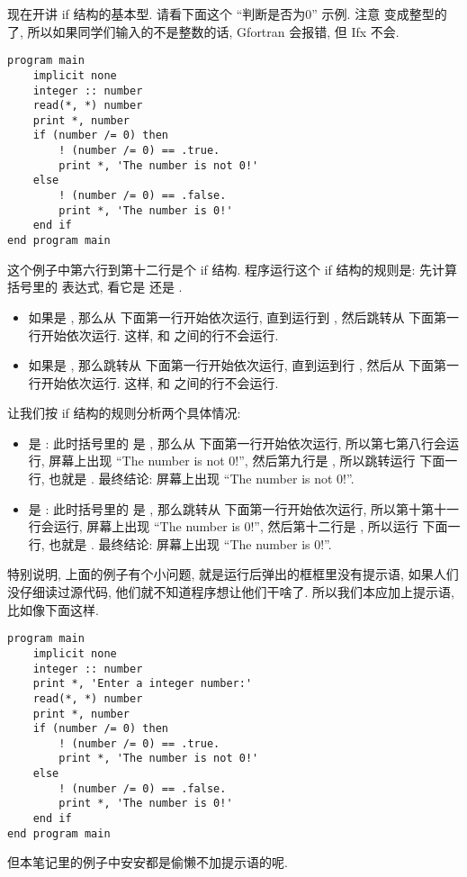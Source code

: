 现在开讲 if 结构的基本型. 请看下面这个 ``判断是否为0'' 示例. 注意  变成整型的了, 所以如果同学们输入的不是整数的话, Gfortran 会报错, 但 Ifx 不会.\label{whether_zero}
\begin{lstlisting}
program main
    implicit none
    integer :: number
    read(*, *) number
    print *, number
    if (number /= 0) then
        ! (number /= 0) == .true.
        print *, 'The number is not 0!'
    else
        ! (number /= 0) == .false.
        print *, 'The number is 0!'
    end if
end program main
\end{lstlisting}
这个例子中第六行到第十二行是个 if 结构. 程序运行这个 if 结构的规则是: 先计算括号里的 表达式, 看它是  还是 .
\begin{itemize}
    \item 如果是 , 那么从  下面第一行开始依次运行, 直到运行到  , 然后跳转从  下面第一行开始依次运行. 这样,  和  之间的行不会运行.
    \item 如果是 , 那么跳转从  下面第一行开始依次运行, 直到运到行  , 然后从  下面第一行开始依次运行. 这样,  和  之间的行不会运行.
\end{itemize}
让我们按 if 结构的规则分析两个具体情况:
\begin{itemize}
    \item {} 是 : 此时括号里的  是 , 那么从  下面第一行开始依次运行, 所以第七第八行会运行, 屏幕上出现 ``The number is not 0!'', 然后第九行是 , 所以跳转运行  下面一行, 也就是 . 最终结论: 屏幕上出现 ``The number is not 0!''.
    \item {} 是 : 此时括号里的  是 , 那么跳转从  下面第一行开始依次运行, 所以第十第十一行会运行, 屏幕上出现 ``The number is 0!'', 然后第十二行是 , 所以运行  下面一行, 也就是 . 最终结论: 屏幕上出现 ``The number is 0!''.
\end{itemize}

特别说明, 上面的例子有个小问题, 就是运行后弹出的框框里没有提示语, 如果人们没仔细读过源代码, 他们就不知道程序想让他们干啥了. 所以我们本应加上提示语, 比如像下面这样.
\begin{lstlisting}
program main
    implicit none
    integer :: number
    print *, 'Enter a integer number:'
    read(*, *) number
    print *, number
    if (number /= 0) then
        ! (number /= 0) == .true.
        print *, 'The number is not 0!'
    else
        ! (number /= 0) == .false.
        print *, 'The number is 0!'
    end if
end program main
\end{lstlisting}
但本笔记里的例子中安安都是偷懒不加提示语的呢.


